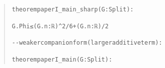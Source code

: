 \documentclass[english,11pt,a4paper]{article}
\begin{document}
\begin{quote}
{\LeanSymbols\fontsize{8}{10}\selectfont
\noindent \nolinkurl{theorem}\hspace{0.45em}\nolinkurl{paperI_main_sharp}\hspace{0.45em}\nolinkurl{(G}\hspace{0.45em}\nolinkurl{:}\hspace{0.45em}\nolinkurl{Split)}\hspace{0.45em}\nolinkurl{:}\par
\noindent \hspace{1.8em}\nolinkurl{G.Phi}\hspace{0.45em}\nolinkurl{≤}\hspace{0.45em}\nolinkurl{(G.n}\hspace{0.45em}\nolinkurl{:}\hspace{0.45em}\nolinkurl{ℝ)}\hspace{0.45em}\nolinkurl{^}\hspace{0.45em}\nolinkurl{2}\hspace{0.45em}\nolinkurl{/}\hspace{0.45em}\nolinkurl{6}\hspace{0.45em}\nolinkurl{+}\hspace{0.45em}\nolinkurl{(G.n}\hspace{0.45em}\nolinkurl{:}\hspace{0.45em}\nolinkurl{ℝ)}\hspace{0.45em}\nolinkurl{/}\hspace{0.45em}\nolinkurl{2}\par
\noindent \par
\noindent \nolinkurl{--}\hspace{0.45em}\nolinkurl{weaker}\hspace{0.45em}\nolinkurl{companion}\hspace{0.45em}\nolinkurl{form}\hspace{0.45em}\nolinkurl{(larger}\hspace{0.45em}\nolinkurl{additive}\hspace{0.45em}\nolinkurl{term):}\par
\noindent \nolinkurl{theorem}\hspace{0.45em}\nolinkurl{paperI_main}\hspace{0.45em}\nolinkurl{(G}\hspace{0.45em}\nolinkurl{:}\hspace{0.45em}\nolinkurl{Split)}\hspace{0.45em}\nolinkurl{:}\par
}
\end{quote}
\end{document}
